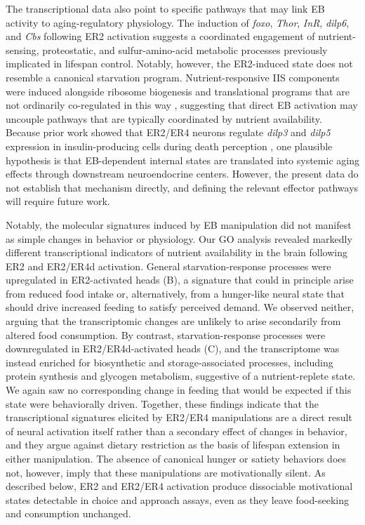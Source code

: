 The transcriptional data also point to specific pathways that may link EB activity to aging-regulatory physiology. 
The induction of \textit{foxo}, \textit{Thor}, \textit{InR}, \textit{dilp6}, and \textit{Cbs} following ER2 activation suggests a coordinated engagement of nutrient-sensing, proteostatic, and sulfur-amino-acid metabolic processes previously implicated in lifespan control. 
Notably, however, the ER2-induced state does not resemble a canonical starvation program. 
Nutrient-responsive IIS components were induced alongside ribosome biogenesis and translational programs that are not ordinarily co-regulated in this way \citep{essers2016}, suggesting that direct EB activation may uncouple pathways that are typically coordinated by nutrient availability. 
Because prior work showed that ER2/ER4 neurons regulate \textit{dilp3} and \textit{dilp5} expression in insulin-producing cells during death perception \citep{gendron2023}, one plausible hypothesis is that EB-dependent internal states are translated into systemic aging effects through downstream neuroendocrine centers. 
However, the present data do not establish that mechanism directly, and defining the relevant effector pathways will require future work.

Notably, the molecular signatures induced by EB manipulation did not manifest as simple changes in behavior or physiology. 
Our GO analysis revealed markedly different transcriptional indicators of nutrient availability in the brain following ER2 and ER2/ER4d activation. 
General starvation-response processes were upregulated in ER2-activated heads (B), a signature that could in principle arise from reduced food intake or, alternatively, from a hunger-like neural state that should drive increased feeding to satisfy perceived demand. 
We observed neither, arguing that the transcriptomic changes are unlikely to arise secondarily from altered food consumption.
By contrast, starvation-response processes were downregulated in ER2/ER4d-activated heads (C), and the transcriptome was instead enriched for biosynthetic and storage-associated processes, including protein synthesis and glycogen metabolism, suggestive of a nutrient-replete state.
We again saw no corresponding change in feeding that would be expected if this state were behaviorally driven. 
Together, these findings indicate that the transcriptional signatures elicited by ER2/ER4 manipulations are a direct result of neural activation itself rather than a secondary effect of changes in behavior, and they argue against dietary restriction as the basis of lifespan extension in either manipulation. 
The absence of canonical hunger or satiety behaviors does not, however, imply that these manipulations are motivationally silent. 
As described below, ER2 and ER2/ER4 activation produce dissociable motivational states detectable in choice and approach assays, even as they leave food-seeking and consumption unchanged.

